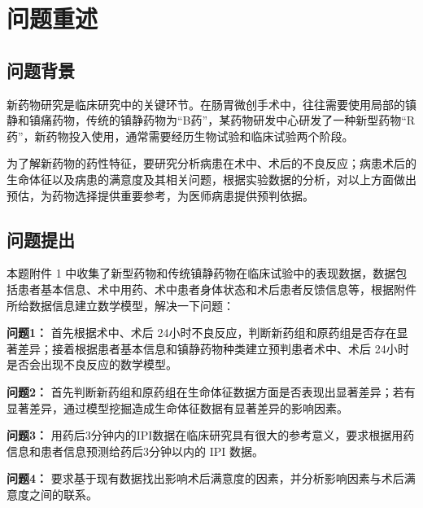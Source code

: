 \section{问题重述}

\subsection{问题背景}

新药物研究是临床研究中的关键环节。在肠胃微创手术中，往往需要使用局部的镇静和镇痛药物，传统的镇静药物为“B药”，某药物研发中心研发了一种新型药物“R药”，新药物投入使用，通常需要经历生物试验和临床试验两个阶段。 

为了解新药物的药性特征，要研究分析病患在术中、术后的不良反应；病患术后的生命体征以及病患的满意度及其相关问题，根据实验数据的分析，对以上方面做出预估，为药物选择提供重要参考，为医师病患提供预判依据。


\subsection{问题提出}

本题附件 1 中收集了新型药物和传统镇静药物在临床试验中的表现数据，数据包括患者基本信息、术中用药、术中患者身体状态和术后患者反馈信息等，根据附件所给数据信息建立数学模型，解决一下问题：

\textbf{问题1：} 首先根据术中、术后 24小时不良反应，判断新药组和原药组是否存在显著差异；接着根据患者基本信息和镇静药物种类建立预判患者术中、术后 24小时是否会出现不良反应的数学模型。 

\textbf{问题2：} 首先判断新药组和原药组在生命体征数据方面是否表现出显著差异；若有显著差异，通过模型挖掘造成生命体征数据有显著差异的影响因素。

\textbf{问题3：} 用药后3分钟内的IPI数据在临床研究具有很大的参考意义，要求根据用药信息和患者信息预测给药后3分钟以内的 IPI 数据。

\textbf{问题4：} 要求基于现有数据找出影响术后满意度的因素，并分析影响因素与术后满意度之间的联系。